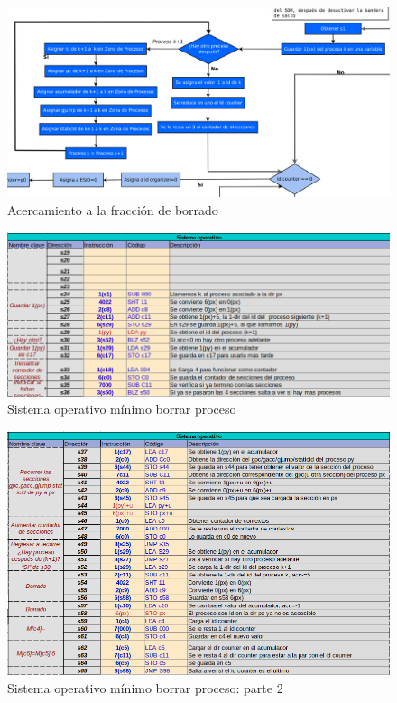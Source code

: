 \documentclass[letterpaper,12pt,oneside]{book}
\begin{document}
			
			\begin{figure}[H]		
				\centering
				\includegraphics[scale=0.32]{media/Paralela/diag_somp_erase.png}
				\caption{Acercamiento a la fracción de borrado}
				\label{fig:diag_somp_erase}
			\end{figure}	
			
			
			\begin{figure}[H]		
				\centering
				\includegraphics[scale=0.53]{media/Paralela/sop_erase1.png}
				\caption{Sistema operativo mínimo borrar proceso}
				\label{fig:sop_erase1}
			\end{figure}
			
			
			\begin{figure}[H]		
				\centering
				\includegraphics[scale=0.53]{media/Paralela/sop_erase2.png}
				\caption{Sistema operativo mínimo borrar proceso: parte 2}
				\label{fig:sop_erase2}
			\end{figure}
\end{document}
